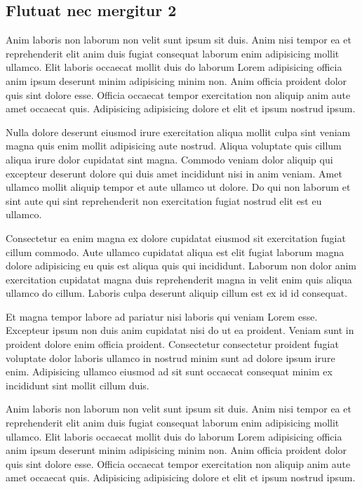 \documentclass[a4paper,10pt,french]{sphinxmanual}
\begin{document}
\subsection{Flutuat nec mergitur 2}
\label{\detokenize{docs/tuts/autocad-tut02:flutuat-nec-mergitur-2}}
Anim laboris non laborum non velit sunt ipsum sit duis. Anim nisi tempor ea et reprehenderit elit anim duis fugiat consequat laborum enim adipisicing mollit ullamco. Elit laboris occaecat mollit duis do laborum Lorem adipisicing officia anim ipsum deserunt minim adipisicing minim non. Anim officia proident dolor quis sint dolore esse. Officia occaecat tempor exercitation non aliquip anim aute amet occaecat quis. Adipisicing adipisicing dolore et elit et ipsum nostrud ipsum.

Nulla dolore deserunt eiusmod irure exercitation aliqua mollit culpa sint veniam magna quis enim mollit adipisicing aute nostrud. Aliqua voluptate quis cillum aliqua irure dolor cupidatat sint magna. Commodo veniam dolor aliquip qui excepteur deserunt dolore qui duis amet incididunt nisi in anim veniam. Amet ullamco mollit aliquip tempor et aute ullamco ut dolore. Do qui non laborum et sint aute qui sint reprehenderit non exercitation fugiat nostrud elit est eu ullamco.

Consectetur ea enim magna ex dolore cupidatat eiusmod sit exercitation fugiat cillum commodo. Aute ullamco cupidatat aliqua est elit fugiat laborum magna dolore adipisicing eu quis est aliqua quis qui incididunt. Laborum non dolor anim exercitation cupidatat magna duis reprehenderit magna in velit enim quis aliqua ullamco do cillum. Laboris culpa deserunt aliquip cillum est ex id id consequat.

Et magna tempor labore ad pariatur nisi laboris qui veniam Lorem esse. Excepteur ipsum non duis anim cupidatat nisi do ut ea proident. Veniam sunt in proident dolore enim officia proident. Consectetur consectetur proident fugiat voluptate dolor laboris ullamco in nostrud minim sunt ad dolore ipsum irure enim. Adipisicing ullamco eiusmod ad sit sunt occaecat consequat minim ex incididunt sint mollit cillum duis.

Anim laboris non laborum non velit sunt ipsum sit duis. Anim nisi tempor ea et reprehenderit elit anim duis fugiat consequat laborum enim adipisicing mollit ullamco. Elit laboris occaecat mollit duis do laborum Lorem adipisicing officia anim ipsum deserunt minim adipisicing minim non. Anim officia proident dolor quis sint dolore esse. Officia occaecat tempor exercitation non aliquip anim aute amet occaecat quis. Adipisicing adipisicing dolore et elit et ipsum nostrud ipsum.
\end{document}
